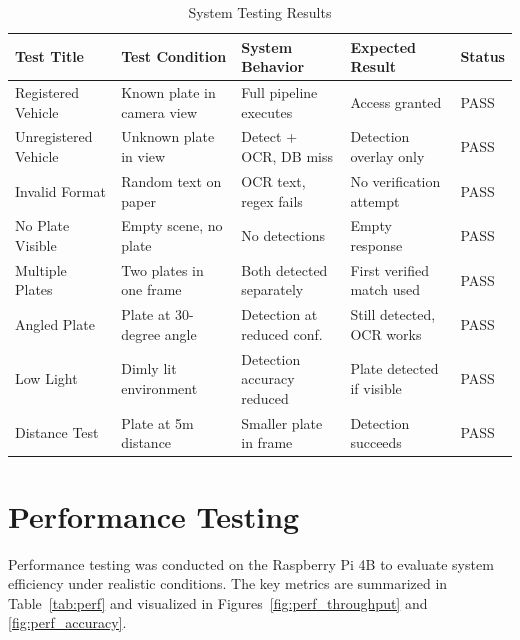 \begin{table}[H]
\centering
\renewcommand{\arraystretch}{1.4}
\setlength{\tabcolsep}{3pt}
\footnotesize
\begin{tabular}{| m{2.3cm} | m{3.2cm} | m{3.5cm} | m{3.2cm} | m{1.2cm} |}
\hline
\textbf{Test Title} & \textbf{Test Condition} & \textbf{System Behavior} & \textbf{Expected Result} & \textbf{Status} \\
\hline
Registered Vehicle & Known plate in camera view & Full pipeline executes & Access granted & PASS \\
\hline
Unregistered Vehicle & Unknown plate in view & Detect + OCR, DB miss & Detection overlay only & PASS \\
\hline
Invalid Format & Random text on paper & OCR text, regex fails & No verification attempt & PASS \\
\hline
No Plate Visible & Empty scene, no plate & No detections & Empty response & PASS \\
\hline
Multiple Plates & Two plates in one frame & Both detected separately & First verified match used & PASS \\
\hline
Angled Plate & Plate at 30-degree angle & Detection at reduced conf. & Still detected, OCR works & PASS \\
\hline
Low Light & Dimly lit environment & Detection accuracy reduced & Plate detected if visible & PASS \\
\hline
Distance Test & Plate at 5m distance & Smaller plate in frame & Detection succeeds & PASS \\
\hline
\end{tabular}
\caption{System Testing Results}
\end{table}

\section{Performance Testing}

Performance testing was conducted on the Raspberry Pi 4B to evaluate system efficiency under realistic conditions. The key metrics are summarized in Table~\ref{tab:perf} and visualized in Figures~\ref{fig:perf_throughput} and \ref{fig:perf_accuracy}.

